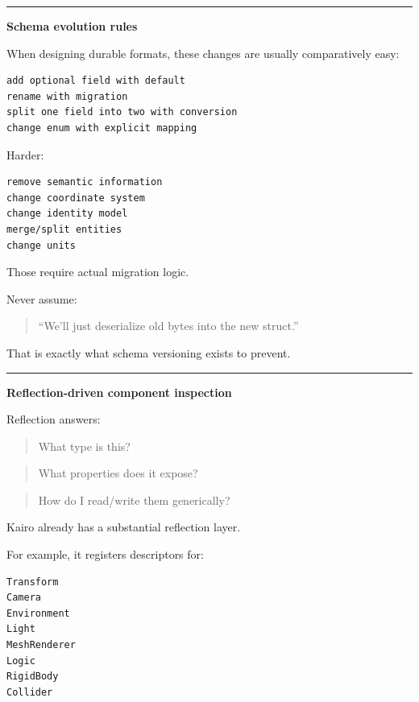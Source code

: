\begin{center}\rule{0.5\linewidth}{0.5pt}\end{center}

\textbf{Schema evolution rules}

When designing durable formats, these changes are usually comparatively easy:

\begin{verbatim}
add optional field with default
rename with migration
split one field into two with conversion
change enum with explicit mapping
\end{verbatim}

Harder:

\begin{verbatim}
remove semantic information
change coordinate system
change identity model
merge/split entities
change units
\end{verbatim}

Those require actual migration logic.

Never assume:

\begin{quote}
``We'll just deserialize old bytes into the new struct.''
\end{quote}

That is exactly what schema versioning exists to prevent.

\begin{center}\rule{0.5\linewidth}{0.5pt}\end{center}

\textbf{Reflection-driven component inspection}

Reflection answers:

\begin{quote}
What type is this?
\end{quote}

\begin{quote}
What properties does it expose?
\end{quote}

\begin{quote}
How do I read/write them generically?
\end{quote}

Kairo already has a substantial reflection layer.

For example, it registers descriptors for:

\begin{verbatim}
Transform
Camera
Environment
Light
MeshRenderer
Logic
RigidBody
Collider
\end{verbatim}

